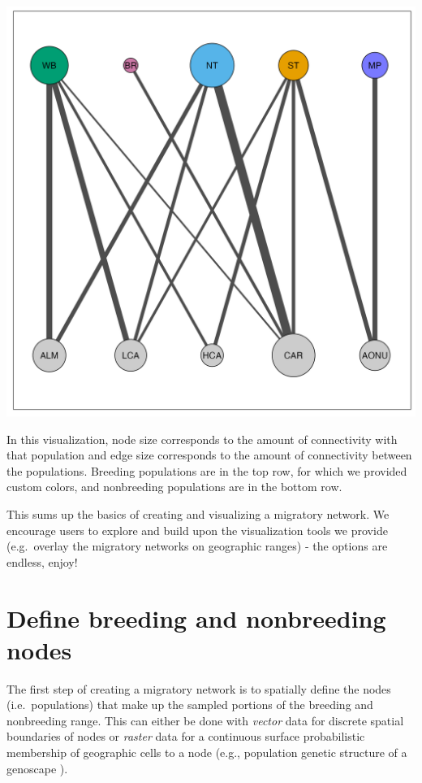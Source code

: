 \documentclass[
]{book}
\begin{document}
\includegraphics[width=29.17in]{./images/p.amre.net}

In this visualization, node size corresponds to the amount of connectivity with that population and edge size corresponds to the amount of connectivity between the populations. Breeding populations are in the top row, for which we provided custom colors, and nonbreeding populations are in the bottom row.

This sums up the basics of creating and visualizing a migratory network. We encourage users to explore and build upon the visualization tools we provide (e.g.~overlay the migratory networks on geographic ranges) - the options are endless, enjoy!

\hypertarget{nodes}{%
\chapter{Define breeding and nonbreeding nodes}\label{nodes}}

The first step of creating a migratory network is to spatially define the nodes (i.e.~populations) that make up the sampled portions of the breeding and nonbreeding range. This can either be done with \emph{vector} data for discrete spatial boundaries of nodes or \emph{raster} data for a continuous surface probabilistic membership of geographic cells to a node (e.g., population genetic structure of a genoscape \citep{ruegg2020genoscape}).
\end{document}
